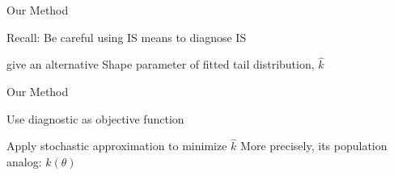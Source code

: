 \documentclass[14pt]{beamer}
\begin{document}
\begin{frame}{Our Method}
    \begin{outline}
        \1 Recall: Be careful using IS means to diagnose IS \newline
        
        \1 \citeauthor{Veh22} give an alternative
            \2 Shape parameter of fitted tail distribution, $\hat{k}$
    \end{outline}
\end{frame}



    


\begin{frame}{Our Method}
    \begin{outline}
        \1 Use diagnostic as objective function \newline

        \1 Apply stochastic approximation to minimize $\hat{k}$
            \2 More precisely, its population analog: $k(\theta)$
    \end{outline}
\end{frame}
\end{document}
